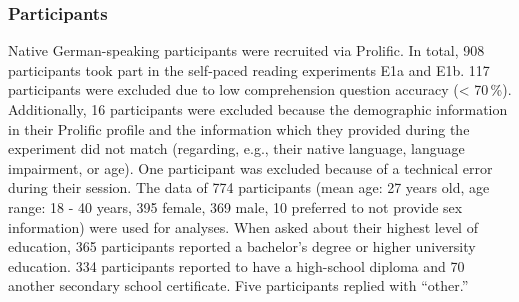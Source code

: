 \documentclass[a4paper, man, floatsintext]{apa7}
\begin{document}


\subsubsection{Participants}





Native German-speaking participants were recruited via Prolific. In total, 908 participants took part in the self-paced reading experiments E1a and E1b. 117 participants were excluded due to low comprehension question accuracy (< 70\,\%). Additionally, 16 participants were excluded because the demographic information in their Prolific profile and the information which they provided during the experiment did not match (regarding, e.g., their native language, language impairment, or age). One participant was excluded because of a technical error during their session. The data of 774 participants (mean age: 27 years old, age range: 18 - 40 years, 395 female, 369 male, 10 preferred to not provide sex information) were used for analyses. When asked about their highest level of education, 365 participants reported a bachelor's degree or higher university education. 334 participants reported to have a high-school diploma and 70 another secondary school certificate. Five participants replied with ``other.'' 
\end{document}
